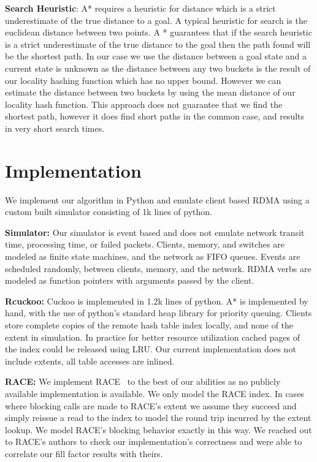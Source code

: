 \textbf{Search Heuristic}: A* requires a heuristic for
distance which is a strict underestimate of the true
distance to a goal. A typical heuristic for search is the
euclidean distance between two points. A * guarantees that
if the search heuristic is a strict underestimate of the
true distance to the goal then the path found will be the
shortest path. In our case we use the distance between a
goal state and a current state is unknown as the distance
between any two buckets is the result of our locality
hashing function which has no upper bound. However we can
estimate the distance between two buckets by using the mean
distance of our locality hash function. This approach does
not guarantee that we find the shortest path, however it
does find short paths in the common case, and results in
very short search times.

\section{Implementation} We implement our algorithm in
Python and emulate client based RDMA using a custom built
simulator consisting of 1k lines of python. 

\textbf{Simulator:} Our simulator is event based and does
not emulate network transit time, processing time, or failed
packets. Clients, memory, and switches are modeled as finite
state machines, and the network as FIFO queues. Events are
scheduled randomly, between clients, memory, and the
network. RDMA verbs are modeled as function pointers with
arguments passed by the client.

\textbf{Rcuckoo:} Cuckoo is implemented in 1.2k lines of
python. A* is implemented by hand, with the use of python's
standard heap library for priority queuing. Clients store
complete copies of the remote hash table index locally, and
none of the extent in simulation. In practice for better
resource utilization cached pages of the index could be
released using LRU. Our current implementation does not
include extents, all table accesses are inlined.

\textbf{RACE:} We implement RACE~\cite{race} to the best of
our abilities as no publicly available implementation is
available. We only model the RACE index. In cases where
blocking calls are made to RACE's extent we assume they
succeed and simply reissue a read to the index to model the
round trip incurred by the extent lookup. We model RACE's
blocking behavior exactly in this way. We reached out to
RACE's authors to check our implementation's correctness and
were able to correlate our fill factor results with theirs.

